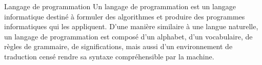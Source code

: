 
\begin{frame}{Langage de programmation}
    Un langage de programmation est un langage informatique destiné à formuler des algorithmes et produire des programmes informatiques qui les appliquent. D'une manière similaire à une langue naturelle, un langage de programmation est composé d'un alphabet, d'un vocabulaire, de règles de grammaire, de significations, mais aussi d'un environnement de traduction censé rendre sa syntaxe compréhensible par la machine.
\end{frame}
